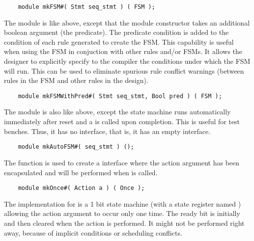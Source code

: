 \begin{verbatim}
    module mkFSM#( Stmt seq_stmt ) ( FSM );
\end{verbatim}

The  module is like  above, except that
the module constructor takes an additional boolean argument (the
predicate). The predicate condition is added to the condition of each
rule generated to create the FSM.  This capability is useful when
using the FSM in conjuction with other rules and/or FSMs.  It allows
the designer to explicitly specify to the compiler the conditions
under which the FSM will run. This can be used to eliminate spurious
rule conflict warnings (between rules in the FSM and other rules in
the design).

\begin{verbatim}
    module mkFSMWithPred#( Stmt seq_stmt, Bool pred ) ( FSM );
\end{verbatim}

The  module is also like  above, except the
state machine runs automatically immediately after reset and a
 is called upon completion.  This is useful for test
benches. Thus, it has no interface, that is, it has an empty
interface.

\begin{verbatim}
    module mkAutoFSM#( seq_stmt ) ();
\end{verbatim}
The  function is used to create a  interface where
the action argument has been encapsulated and will be performed when
 is called.
\begin{verbatim}
    module mkOnce#( Action a ) ( Once );
\end{verbatim}
The implementation for  is a 1 bit state machine (with a
state register named ) allowing the
action argument to  occur only one time.  The ready bit is initially 
and then cleared when the action is performed. It might not be performed
right away, because of implicit conditions or scheduling conflicts.  


